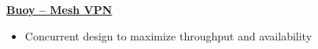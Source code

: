 \textbf{\href{https://github.com/prairir/Buoy}{Buoy -- Mesh VPN}} \par

\begin{itemize}
    \item Concurrent design to maximize throughput   and availability
\end{itemize}
